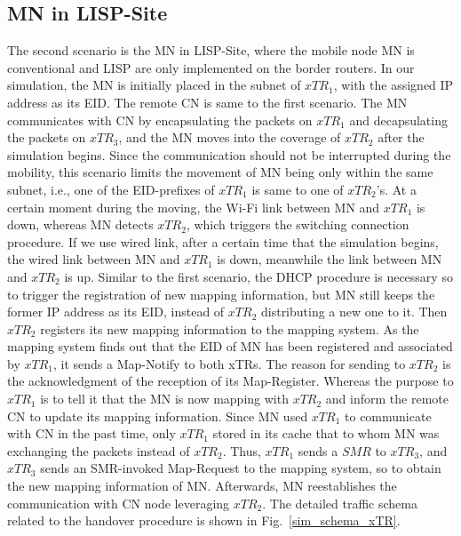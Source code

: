 \subsection{MN in LISP-Site}
\label{sec:ns3_analysis_xTR}
The second scenario is the MN in LISP-Site, where the mobile node MN is conventional and LISP are only implemented on the border routers. In our simulation, the MN is initially placed in the subnet of $xTR_1$, with the assigned IP address as its EID. The remote CN is same to the first scenario. The MN communicates with CN by encapsulating the packets on $xTR_1$ and decapsulating the packets on $xTR_3$, and the MN moves into the coverage of $xTR_2$ after the simulation begins. Since the communication should not be interrupted during the mobility, this scenario limits the movement of MN being only within the same subnet, i.e., one of the EID-prefixes of $xTR_1$ is same to one of $xTR_2$'s. At a certain moment during the moving, the Wi-Fi link between MN and $xTR_1$ is down, whereas MN detects $xTR_2$, which triggers the switching connection procedure. If we use wired link, after a certain time that the simulation begins, the wired link between MN and $xTR_1$ is down, meanwhile the link between MN and $xTR_2$ is up. Similar to the first scenario, the DHCP procedure is necessary so to trigger the registration of new mapping information, but MN still keeps the former IP address as its EID, instead of $xTR_2$ distributing a new one to it. Then $xTR_2$ registers its new mapping information to the mapping system. As the mapping system finds out that the EID of MN has been registered and associated by $xTR_1$, it sends a Map-Notify to both xTRs. The reason for sending to $xTR_2$ is the acknowledgment of the reception of its Map-Register. Whereas the purpose to $xTR_1$ is to tell it that the MN is now mapping with $xTR_2$ and inform the remote CN to update its mapping information. Since MN used $xTR_1$ to communicate with CN in the past time, only $xTR_1$ stored in its cache that to whom MN was exchanging the packets instead of $xTR_2$. Thus, $xTR_1$ sends a $SMR$ to $xTR_3$, and $xTR_3$ sends an SMR-invoked Map-Request to the mapping system, so to obtain the new mapping information of MN. Afterwards, MN reestablishes the communication with CN node leveraging $xTR_2$. The detailed traffic schema related to the handover procedure is shown in Fig.~\ref{sim_schema_xTR}.
